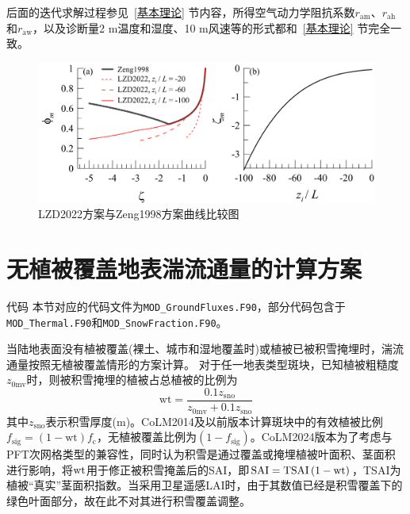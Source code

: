 后面的迭代求解过程参见~\ref{基本理论} 节内容，所得空气动力学阻抗系数$r_{\mathrm{am}}$、$r_{\mathrm{ah}}$和$r_{\mathrm{aw}}$，以及诊断量2 m温度和湿度、10 m风速等的形式都和~\ref{基本理论} 节完全一致。
{
  \begin{figure}[htbp]
    \centering
    \includegraphics[scale=0.7]{Figures/地表湍流交换过程/LZD2022方案与Zeng1998方案曲线比较图.png}
    \caption{LZD2022方案与Zeng1998方案曲线比较图}
    \label{fig:LZD2022方案与Zeng1998方案曲线比较图}
  \end{figure}
}


\section{无植被覆盖地表湍流通量的计算方案}\label{无植被覆盖地表湍流通量的计算方案}
\begin{mymdframed}{代码}
  本节对应的代码文件为\texttt{MOD\_GroundFluxes.F90}，部分代码包含于\texttt{MOD\_Thermal.F90}和\texttt{MOD\_SnowFraction.F90}。
\end{mymdframed}

当陆地表面没有植被覆盖(裸土、城市和湿地覆盖时)或植被已被积雪掩埋时，湍流通量按照无植被覆盖情形的方案计算。
对于任一地表类型斑块，已知植被粗糙度$z_{\mathrm{0mv}}$时，则被积雪掩埋的植被占总植被的比例为
\begin{equation}
  {\mathrm {wt}}=\frac{0.1 z_{\mathrm{{sno}}}}{z_{\mathrm{0mv}}+0.1 z_{\mathrm{{sno}}}}
\end{equation}
其中$z_{\mathrm{sno}}$表示积雪厚度(m)。CoLM2014及以前版本计算斑块中的有效植被比例$f_{\mathrm{sig}}=\left(1-{\mathrm {wt}}\right)f_{\mathrm{c}}$，无植被覆盖比例为$\left(1-f_{\mathrm{sig}}\right)$。CoLM2024版本为了考虑与PFT次网格类型的兼容性，同时认为积雪是通过覆盖或掩埋植被叶面积、茎面积进行影响，将$\rm wt$用于修正被积雪掩盖后的SAI，即${\rm SAI=TSAI}\left(1-{\mathrm {wt}}\right)$，TSAI为植被“真实”茎面积指数。当采用卫星遥感LAI时，由于其数值已经是积雪覆盖下的绿色叶面部分，故在此不对其进行积雪覆盖调整。


